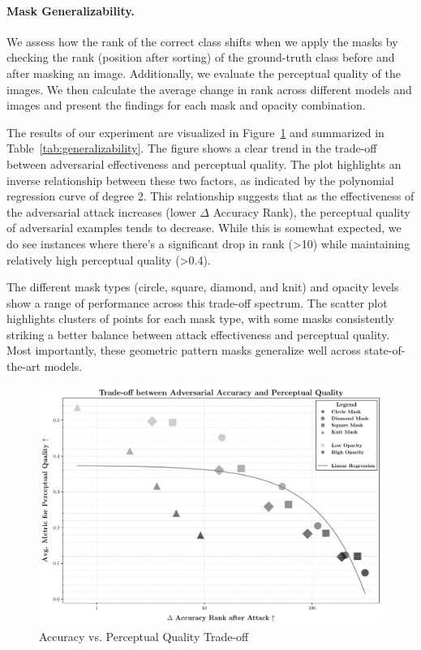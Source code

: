 \documentclass[a4paper, oneside]{discothesis}
\begin{document}
\paragraph{Mask Generalizability.}

We assess how the rank of the correct class shifts when we apply the masks by checking the rank (position after sorting) of the ground-truth class before and after masking an image. Additionally, we evaluate the perceptual quality of the images. We then calculate the average change in rank across different models and images and present the findings for each mask and opacity combination. 

The results of our experiment are visualized in Figure~\ref{fig:accpercept} and summarized in Table~\ref{tab:generalizability}. The figure shows a clear trend in the trade-off between adversarial effectiveness and perceptual quality. The plot highlights an inverse relationship between these two factors, as indicated by the polynomial regression curve of degree 2. This relationship suggests that as the effectiveness of the adversarial attack increases (lower $\Delta$ Accuracy Rank), the perceptual quality of adversarial examples tends to decrease. While this is somewhat expected, we do see instances where there's a significant drop in rank (>10) while maintaining relatively high perceptual quality (>0.4).

The different mask types (circle, square, diamond, and knit) and opacity levels show a range of performance across this trade-off spectrum. The scatter plot highlights clusters of points for each mask type, with some masks consistently striking a better balance between attack effectiveness and perceptual quality. Most importantly, these geometric pattern masks generalize well across state-of-the-art models.

\begin{figure}
	\centering
	\includegraphics[width=1\columnwidth]{figures/eval_cls_generalizability.pdf}
	\caption{Accuracy vs. Perceptual Quality Trade-off}
	\label{fig:accpercept}
\end{figure}
\end{document}
